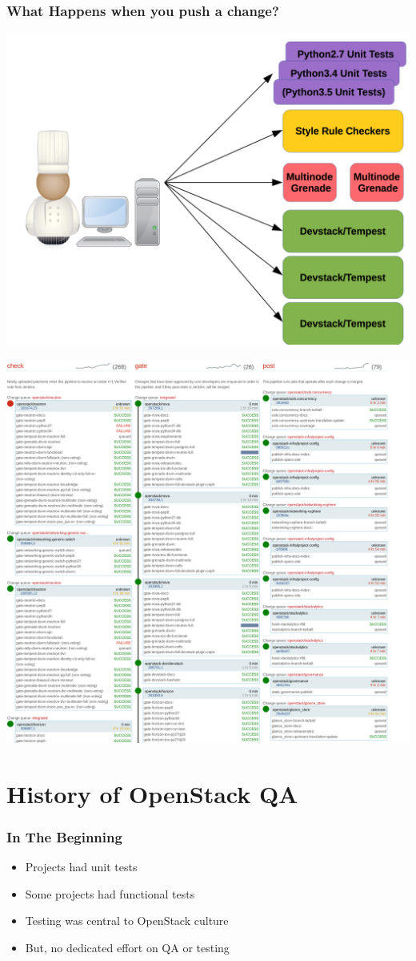 \documentclass[aspectratio=169,11pt,hyperref={colorlinks=true}]{beamer}
\begin{document}
\begin{frame}
\frametitle{What Happens when you push a change?}
\begin{center}
    \includegraphics[width=.7\textwidth]{jobs.png}
\end{center}
\end{frame}

\begin{frame}
\begin{center}
    \includegraphics[width=.8\textwidth]{ZuulStatus.png}
\end{center}
\end{frame}

\section{History of OpenStack QA}

\begin{frame}
    \frametitle{In The Beginning}
    \begin{itemize}
    \item Projects had unit tests
    \item Some projects had functional tests
    \item Testing was central to OpenStack culture
    \item But, no dedicated effort on QA or testing
    \end{itemize}
\end{frame}
\end{document}
